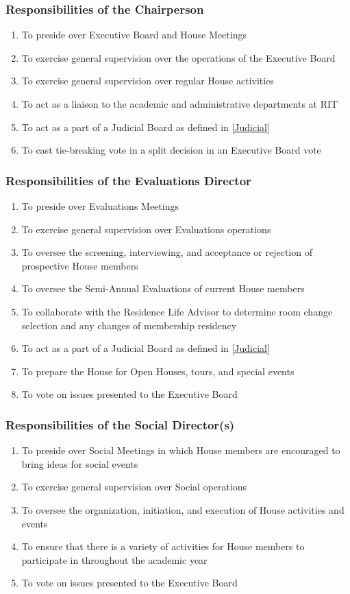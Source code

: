 \documentclass{article}
\newcommand{\asubsection}[1]{\subsubsection{#1} \label{#1}}
\begin{document}
\asubsection{Responsibilities of the Chairperson}
\begin{enumerate}
	\item To preside over Executive Board and House Meetings
	\item To exercise general supervision over the operations of the Executive Board
	\item To exercise general supervision over regular House activities
	\item To act as a liaison to the academic and administrative departments at RIT
	\item To act as a part of a Judicial Board as defined in \ref{Judicial}
	\item To cast tie-breaking vote in a split decision in an Executive Board vote
\end{enumerate}

\asubsection{Responsibilities of the Evaluations Director}
\begin{enumerate}
	\item To preside over Evaluations Meetings
	\item To exercise general supervision over Evaluations operations
	\item To oversee the screening, interviewing, and acceptance or rejection of prospective House members
	\item To oversee the Semi-Annual Evaluations of current House members
	\item To collaborate with the Residence Life Advisor to determine room change selection and any changes of membership residency
	\item To act as a part of a Judicial Board as defined in \ref{Judicial}
	\item To prepare the House for Open Houses, tours, and special events
	\item To vote on issues presented to the Executive Board
\end{enumerate}

\asubsection{Responsibilities of the Social Director(s)}
\begin{enumerate}
	\item To preside over Social Meetings in which House members are encouraged to bring ideas for social events
	\item To exercise general supervision over Social operations
	\item To oversee the organization, initiation, and execution of House activities and events
	\item To ensure that there is a variety of activities for House members to participate in throughout the academic year
	\item To vote on issues presented to the Executive Board
\end{enumerate}
\end{document}
